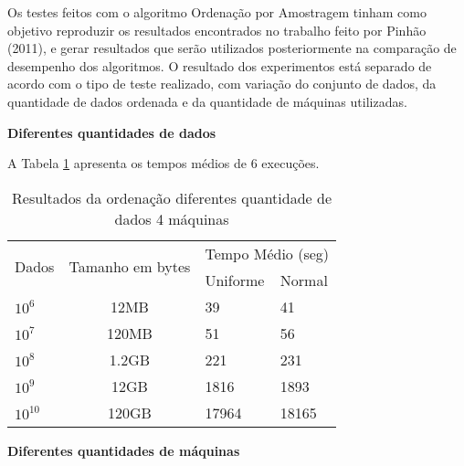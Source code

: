 Os testes feitos com o algoritmo Ordenação por Amostragem tinham como objetivo reproduzir os resultados encontrados no trabalho feito por Pinhão (2011), e gerar resultados 
que serão utilizados posteriormente na comparação de desempenho dos algoritmos. 
O resultado dos experimentos está separado de acordo com o tipo de teste realizado, com variação do conjunto de dados, da quantidade de dados ordenada e da quantidade de máquinas utilizadas. 

%

\noindent
\textbf{Diferentes quantidades de dados}

A Tabela \ref{tab:QuantidadeDados} apresenta os tempos médios de 6 execuções. 

\begin{table}[htbp]
\caption{Resultados da ordenação diferentes quantidade de dados 4 máquinas}
\begin{center}
\begin{tabular}{|l|c|l|l|} \hline
\multirow{2}{*}{Dados} & \multirow{2}{*}{Tamanho em bytes} & \multicolumn{2}{|c|}{Tempo Médio (seg)} \\
\cline{3-4}
	 & 		& Uniforme 	& Normal	\\ \hline \hline
$10^{6}$ &12MB	 	&39		&41		\\ \hline 
$10^{7}$ &120MB		&51		&56		\\ \hline 
$10^{8}$ &1.2GB	 	&221		&231		\\ \hline 
$10^{9}$ &12GB		&1816		&1893		\\ \hline 
$10^{10}$ &120GB 	&17964		&18165		\\ \hline 
\end{tabular}
\end{center}
\label{tab:QuantidadeDados}
\end{table}

\noindent
\textbf{Diferentes quantidades de máquinas}
